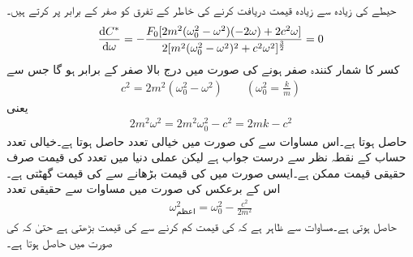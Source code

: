 حیطے کی زیادہ سے زیادہ قیمت دریافت کرنے کی خاطر  کے تفرق کو صفر کے برابر  پر کرتے ہیں۔
\begin{align*}
\frac{\dif C^*}{\dif \omega}=-\frac{F_0[2m^2(\omega_0^2-\omega^2)(-2\omega)+2c^2\omega]}{2[m^2(\omega_0^2-\omega^2)^2+c^2\omega^2]^{\frac{3}{2}}}=0
\end{align*}
کسر کا شمار کنندہ صفر ہونے کی صورت میں درج بالا صفر کے برابر ہو گا جس سے
\begin{align}
c^2=2m^2(\omega_0^2-\omega^2)\quad \quad (\omega_0^2=\frac{k}{m})
\end{align}
یعنی
\begin{align}\label{مساوات_سادہ_دو_عملی_گمک_تعدد_الف}
2m^2\omega^2=2m^2\omega_0^2-c^2=2mk-c^2
\end{align}
حاصل ہوتا ہے۔اس مساوات سے   کی صورت میں خیالی تعدد  حاصل ہوتا ہے۔خیالی تعدد حساب کے نقطہ نظر سے درست جواب  ہے لیکن عملی دنیا میں تعدد کی قیمت صرف حقیقی قیمت ممکن ہے۔ایسی صورت میں  کی قیمت بڑھانے سے  کی قیمت گھٹتی ہے۔اس کے برعکس  کی صورت میں  مساوات  سے حقیقی تعدد 
\begin{align}\label{مساوات_سادہ_دو_عملی_گمک_تعدد_ب}
\omega^2_{\text{اعظم}}=\omega_0^2-\frac{c^2}{2m^2}
\end{align}
حاصل ہوتی ہے۔مساوات  سے ظاہر ہے کہ  کی قیمت کم کرنے سے  کی قیمت  بڑھتی ہے حتیٰ کہ  کی صورت میں  حاصل ہوتا ہے۔

